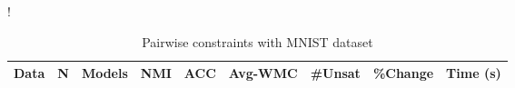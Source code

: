\begin{table}[ht]
\caption{Pairwise constraints with MNIST dataset}\label{tab:pw-mnist}
\resizebox{\columnwidth}!{
\begin{tabular}{ | H  r | r | r | r | r | r | r | r |}
\hline
Data & N & Models & NMI & ACC & Avg-WMC & #Unsat & \%Change & Time (s)  \\  \hline
\end{tabular}
}
\end{table}